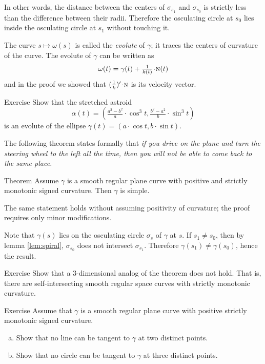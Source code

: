 In other words, the distance between the centers of $\sigma_{s_1}$ and $\sigma_{s_0}$
is strictly less than the difference between their radii.
Therefore the osculating circle at $s_0$ lies inside the osculating circle at $s_1$ without touching it.
\qeds

The curve $s\mapsto \omega(s)$ is called the \emph{evolute} of $\gamma$; 
it traces the centers of curvature of the curve. 
The evolute of $\gamma$ can be written as 
\[\omega(t)=\gamma(t)+\tfrac1{\skur(t)}\cdot \norm(t)\] and  
in the proof we showed that $(\tfrac1{\skur})'\cdot\norm$ is its velocity vector.

\begin{thm}{Exercise}\label{ex:evolute-of-ellipse}
Show that the stretched astroid 
\[\alpha(t)=(\tfrac{a^2-b^2}{a}\cdot \cos^3 t,  \tfrac{b^2-a^2}{b}\cdot\sin^3 t)\]
is an evolute of the ellipse $\gamma(t)= (a\cdot \cos t, b\cdot\sin t)$.
\end{thm}


The following theorem states formally that 
\emph{if you drive on the plane and turn the steering wheel to the left all the time,
then you will not be able to come back to the same place.}

\begin{thm}{Theorem}\label{thm:spiral}
Assume $\gamma$ is a smooth regular plane curve with positive and strictly monotonic signed curvature. 
Then $\gamma$ is simple.
\end{thm}

The same statement holds without assuming positivity of curvature; the proof requires only minor modifications.

Note that $\gamma(s)$ lies on the osculating circle $\sigma_s$ of $\gamma$ at $s$.
If $s_1\ne s_0$, then by lemma \ref{lem:spiral}, $\sigma_{s_0}$ does not intersect $\sigma_{s_1}$.
Therefore $\gamma(s_1)\ne \gamma(s_0)$,
hence the result.\qeds

\begin{thm}{Exercise}\label{ex:3D-spiral}
Show that a 3-dimensional analog of the theorem does not hold.
That is, there are self-intersecting smooth regular space curves with strictly monotonic curvature.
\end{thm}

\begin{thm}{Exercise}\label{ex:double-tangent}
Assume that $\gamma$ is a smooth regular plane curve with positive strictly monotonic signed curvature.
\begin{enumerate}[(a)]
\item\label{ex:double-tangent:a}Show that no line can be tangent to $\gamma$ at two distinct points.
\item Show that no circle can be tangent to $\gamma$ at three distinct points. 
\end{enumerate}
\end{thm} %

